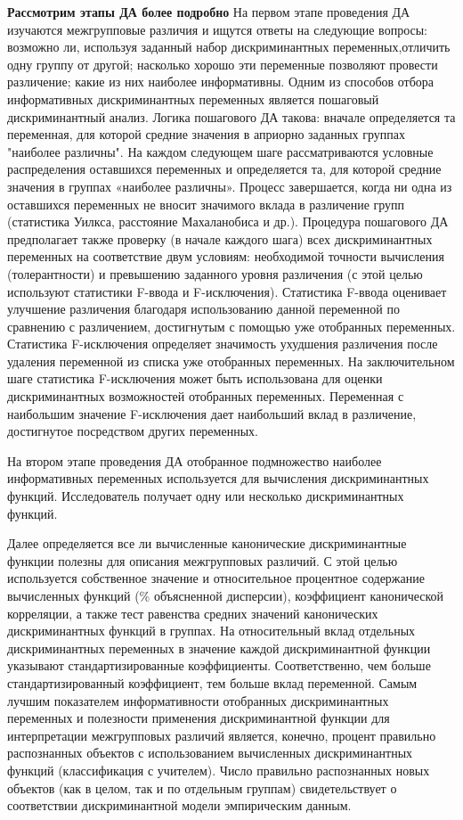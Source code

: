 \documentclass[a4paper, 12pt]{article}
\begin{document}
\textbf{Рассмотрим этапы ДА более подробно}
На первом этапе проведения ДА изучаются межгрупповые различия и ищутся ответы на следующие вопросы: возможно ли, используя заданный набор дискриминантных переменных,отличить одну группу от другой; насколько хорошо эти переменные позволяют провести различение; какие из них наиболее информативны. Одним из способов отбора информативных дискриминантных переменных является пошаговый дискриминантный анализ. Логика пошагового ДА такова: вначале определяется та переменная, для которой средние значения в априорно заданных группах "наиболее различны". На каждом следующем шаге рассматриваются условные распределения оставшихся переменных и определяется та, для которой средние значения в группах «наиболее различны». Процесс завершается, когда ни одна из оставшихся переменных не вносит значимого вклада в различение групп (статистика Уилкса, расстояние Махаланобиса и др.). Процедура пошагового ДА предполагает также проверку (в начале каждого шага) всех дискриминантных переменных на соответствие двум условиям: необходимой точности вычисления (толерантности) и превышению заданного уровня различения (с этой целью используют статистики F-ввода и F-исключения). Статистика F-ввода оценивает улучшение различения благодаря использованию данной переменной по сравнению с различением, достигнутым с помощью уже отобранных переменных. Статистика F-исключения определяет значимость ухудшения различения после удаления переменной из списка уже отобранных переменных. На заключительном шаге статистика F-исключения может быть использована для оценки дискриминантных возможностей отобранных переменных. Переменная с наибольшим значение F-исключения дает наибольший вклад в различение, достигнутое посредством других переменных.

На втором этапе проведения ДА отобранное подмножество наиболее информативных переменных используется для вычисления дискриминантных функций. Исследователь получает одну или несколько дискриминантных функций.

Далее определяется все ли вычисленные канонические дискриминантные функции полезны для описания межгрупповых различий. С этой целью используется собственное значение и относительное процентное содержание вычисленных функций (\% объясненной дисперсии), коэффициент канонической корреляции, а также тест равенства средних значений канонических дискриминантных функций в группах. На относительный вклад отдельных дискриминантных переменных в значение каждой дискриминантной функции указывают стандартизированные коэффициенты. Соответственно, чем больше стандартизированный коэффициент, тем больше вклад переменной. Самым лучшим показателем информативности отобранных дискриминантных переменных и полезности применения дискриминантной функции для интерпретации межгрупповых различий является, конечно, процент правильно распознанных объектов с использованием вычисленных дискриминантных функций (классификация с учителем). Число правильно распознанных новых объектов (как в целом, так и по отдельным группам) свидетельствует о соответствии дискриминантной модели эмпирическим данным.
\end{document}
